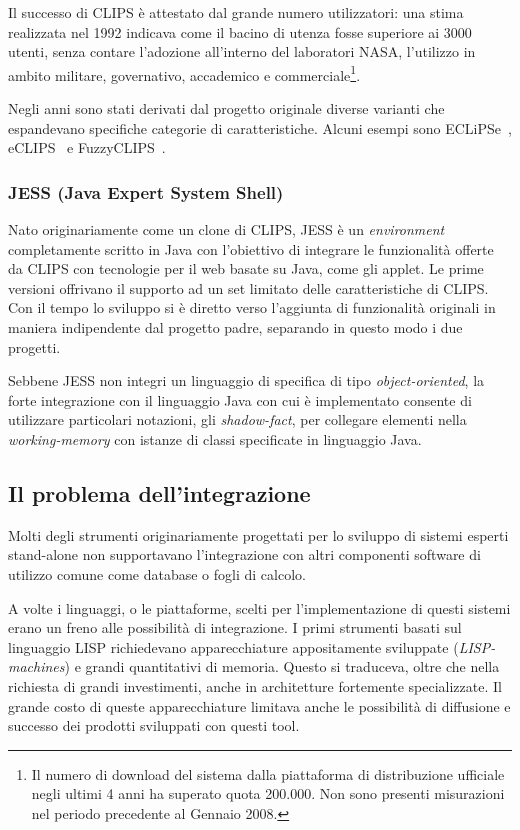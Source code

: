 Il successo di CLIPS è attestato dal grande numero utilizzatori: una stima realizzata nel 1992 indicava come il bacino di utenza fosse superiore ai 3000 utenti, senza contare l'adozione all'interno del laboratori NASA, l'utilizzo in ambito militare, governativo, accademico e commerciale\footnote{Il numero di download del sistema dalla piattaforma di distribuzione ufficiale negli ultimi 4 anni ha superato quota 200.000. Non sono presenti misurazioni nel periodo precedente al Gennaio 2008.}.~\cite{clipsarch1992}

Negli anni sono stati derivati dal progetto originale diverse varianti che espandevano specifiche categorie di caratteristiche. Alcuni esempi sono ECLiPSe~\cite{haley1991}, eCLIPS~\cite{eclips} e FuzzyCLIPS~\cite{fuzzyclips}.

\subsubsection{JESS (Java Expert System Shell)}
Nato originariamente come un clone di CLIPS, JESS è un \emph{environment} completamente scritto in Java con l'obiettivo di integrare le funzionalità offerte da CLIPS con tecnologie per il web basate su Java, come gli applet. 
Le prime versioni offrivano il supporto ad un set limitato delle caratteristiche di CLIPS. Con il tempo lo sviluppo si è diretto verso l'aggiunta di funzionalità originali in maniera indipendente dal progetto padre, separando in questo modo i due progetti.~\cite{laerhoven1999}~\cite{jessfaq}~\cite{jessmanual}

Sebbene JESS non integri un linguaggio di specifica di tipo \emph{object-oriented}, la forte integrazione con il linguaggio Java con cui è implementato consente di utilizzare particolari notazioni, gli \emph{shadow-fact}, per collegare elementi nella \emph{working-memory} con istanze di classi specificate in linguaggio Java.


\subsection{Il problema dell'integrazione}

Molti degli strumenti originariamente progettati per lo sviluppo di sistemi esperti stand-alone non supportavano l'integrazione con altri componenti software di utilizzo comune come database o fogli di calcolo.

A volte i linguaggi, o le piattaforme, scelti per l'implementazione di questi sistemi erano un freno alle possibilità di integrazione. I primi strumenti basati sul linguaggio LISP richiedevano apparecchiature appositamente sviluppate (\emph{LISP-machines}) e grandi quantitativi di memoria. Questo si traduceva, oltre che nella richiesta di grandi investimenti, anche in architetture fortemente specializzate. Il grande costo di queste apparecchiature limitava anche le possibilità di diffusione e successo dei prodotti sviluppati con questi tool.~\cite{development1993}


